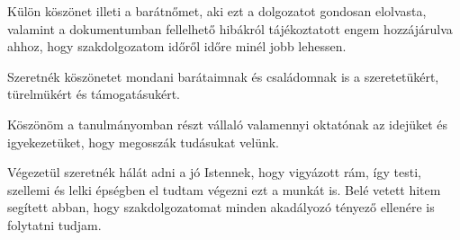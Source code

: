 \documentclass[tocnopagenum]{thesis-ekf}
\theoremstyle{definition}
\theoremstyle{remark}
\begin{document}
	Külön köszönet illeti a barátnőmet, aki ezt a dolgozatot gondosan elolvasta, valamint a dokumentumban fellelhető hibákról tájékoztatott engem hozzájárulva ahhoz, hogy szakdolgozatom időről időre minél jobb lehessen.
	
	Szeretnék köszönetet mondani barátaimnak és családomnak is a szeretetükért, türelmükért és támogatásukért.
	
	Köszönöm a tanulmányomban részt vállaló valamennyi oktatónak az idejüket és igyekezetüket, hogy megosszák tudásukat velünk.
	
	Végezetül szeretnék hálát adni a jó Istennek, hogy vigyázott rám, így testi, szellemi és lelki épségben el tudtam végezni ezt a munkát is. Belé vetett hitem segített abban, hogy szakdolgozatomat minden akadályozó tényező ellenére is folytatni tudjam.
	
	
	\listoffigures
\end{document}
